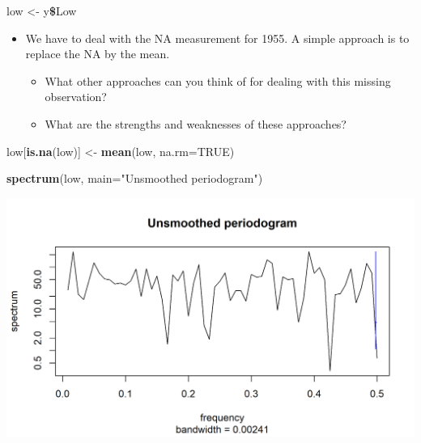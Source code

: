 \documentclass[]{article}
\newenvironment{Shaded}{\begin{snugshade}}{\end{snugshade}}
\newcommand{\KeywordTok}[1]{\textcolor[rgb]{0.13,0.29,0.53}{\textbf{#1}}}
\newcommand{\DataTypeTok}[1]{\textcolor[rgb]{0.13,0.29,0.53}{#1}}
\newcommand{\StringTok}[1]{\textcolor[rgb]{0.31,0.60,0.02}{#1}}
\newcommand{\OtherTok}[1]{\textcolor[rgb]{0.56,0.35,0.01}{#1}}
\newcommand{\OperatorTok}[1]{\textcolor[rgb]{0.81,0.36,0.00}{\textbf{#1}}}
\newcommand{\NormalTok}[1]{#1}
\begin{document}
\begin{Shaded}
\begin{Highlighting}[]
\NormalTok{low <-}\StringTok{ }\NormalTok{y}\OperatorTok{\$}\NormalTok{Low}
\end{Highlighting}
\end{Shaded}

\begin{itemize}
\item
  We have to deal with the NA measurement for 1955. A simple approach is
  to replace the NA by the mean.

  \begin{itemize}
  \item
    What other approaches can you think of for dealing with this missing
    observation?
  \item
    What are the strengths and weaknesses of these approaches?
  \end{itemize}
\end{itemize}

\begin{Shaded}
\begin{Highlighting}[]
\NormalTok{low[}\KeywordTok{is.na}\NormalTok{(low)] <-}\StringTok{ }\KeywordTok{mean}\NormalTok{(low, }\DataTypeTok{na.rm=}\OtherTok{TRUE}\NormalTok{)}
\end{Highlighting}
\end{Shaded}

\begin{Shaded}
\begin{Highlighting}[]
\KeywordTok{spectrum}\NormalTok{(low, }\DataTypeTok{main=}\StringTok{"Unsmoothed periodogram"}\NormalTok{)}
\end{Highlighting}
\end{Shaded}

\begin{center}\includegraphics{figure/intro-periodogram-1} \end{center}
\end{document}
